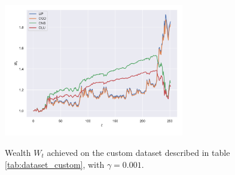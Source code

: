 \begin{figure}[ht!]
\centering
{\includegraphics[width=0.70\textwidth,keepaspectratio]{img/new_experiemnts_1920.pdf}} 
\caption{Wealth $W_t$ achieved on the custom dataset described in table \ref{tab:dataset_custom}, with $\gamma=0.001$.}
\label{fig:wealth_custom}
\end{figure}
